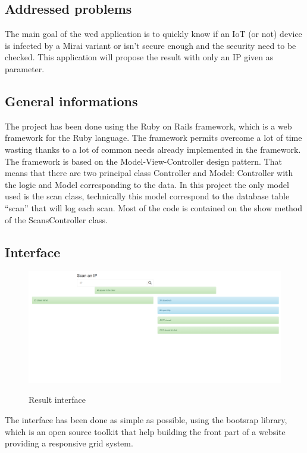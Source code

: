 \documentclass{report}
\begin{document}
\subsection{Addressed problems}
The main goal of the wed application is to quickly know if an IoT (or not) device is infected by a Mirai variant or isn't secure enough and the security need to be checked. This application will propose the result with only an IP given as parameter.

\subsection{General informations}
The project has been done using the Ruby on Rails framework, which is a web framework for the Ruby language. The framework permits overcome a lot of time wasting thanks to a lot of common needs  already implemented in the framework. The framework is based on the Model-View-Controller design pattern. That means that there are two principal class Controller and Model: Controller with the logic and Model corresponding to the data. In this project the only model used is the scan class, technically this model correspond to the database table ``scan'' that will log each scan. Most of the code is contained on the show method of the ScansController class.

\subsection{Interface}
\begin{figure}[h]
 \caption{Result interface}
 \centering
 \includegraphics[width=1.3\textwidth]{./img/vulweb-result}
 \label{fig:screen-act}
\end{figure}
The interface has been done as simple as possible, using the bootsrap library\autocite{bootstrap}, which is an open source toolkit that help building the front part of a website providing a responsive grid system.
\end{document}
